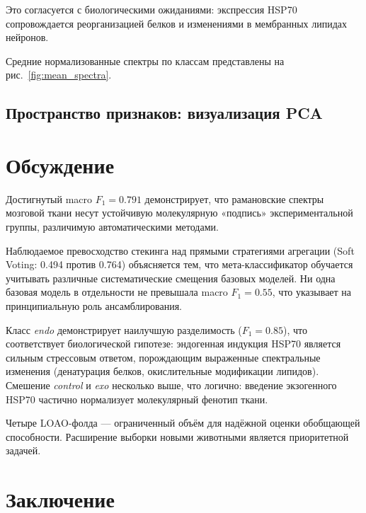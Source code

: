 \documentclass[12pt, a4paper]{article}
\begin{document}
Это согласуется с биологическими ожиданиями: экспрессия HSP70
сопровождается реорганизацией белков и изменениями
в мембранных липидах нейронов.

Средние нормализованные спектры по классам представлены на
рис.~\ref{fig:mean_spectra}.

\subsection{Пространство признаков: визуализация PCA}

\section{Обсуждение}

Достигнутый macro $F_1 = 0.791$ демонстрирует, что рамановские
спектры мозговой ткани несут устойчивую молекулярную «подпись»
экспериментальной группы, различимую автоматическими методами.

Наблюдаемое превосходство стекинга над прямыми стратегиями агрегации
(Soft Voting: 0.494 против 0.764) объясняется тем, что мета-классификатор
обучается учитывать различные систематические смещения базовых моделей.
Ни одна базовая модель в отдельности не превышала macro $F_1 = 0.55$,
что указывает на принципиальную роль ансамблирования.

Класс \textit{endo} демонстрирует наилучшую разделимость ($F_1 = 0.85$),
что соответствует биологической гипотезе: эндогенная индукция HSP70
является сильным стрессовым ответом, порождающим выраженные
спектральные изменения (денатурация белков, окислительные модификации
липидов). Смешение \textit{control} и \textit{exo} несколько выше,
что логично: введение экзогенного HSP70 частично нормализует
молекулярный фенотип ткани.

Четыре LOAO-фолда — ограниченный объём для надёжной оценки
обобщающей способности. Расширение выборки новыми животными
является приоритетной задачей.

\section{Заключение}
\end{document}
